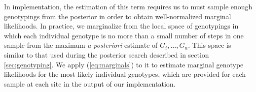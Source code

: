\documentclass{article}
\begin{document}
In implementation, the estimation of this term requires us to must sample enough genotypings from the posterior in order to obtain well-normalized marginal likelihoods.  In practice, we marginalize from the local space of genotypings in which each individual genotype is no more than a small number of steps in one sample from the maximum \emph{a posteriori} estimate of $G_i,\ldots,G_n$.  This space is similar to that used during the posterior search described in section \ref{sec:genotyping}.  We apply (\ref{eq:marginals}) to it to estimate marginal genotype likelihoods for the most likely individual genotypes, which are provided for each sample at each site in the output of our implementation.





%


{}
%

\end{document}
